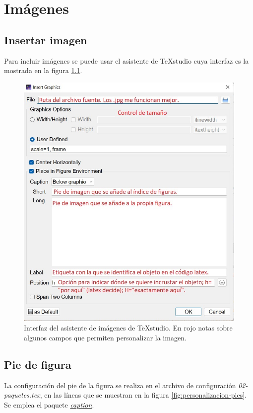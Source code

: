 \chapter{Imágenes}
%
\section{Insertar imagen}
Para incluir imágenes se puede usar el asistente de TeXstudio cuya interfaz es la mostrada en la figura \ref{fig:auxiliar-imagenes}.

\begin{figure}[h]
	\centering
	\includegraphics[scale=.65, frame]{cuerpo/cap-objetos/imagenes/auxiliar-imagenes}
	\caption[Interfaz del asistente de imágenes de TeXstudio.]{Interfaz del asistente de imágenes de TeXstudio. En rojo notas sobre algunos campos que permiten personalizar la imagen.}
	\label{fig:auxiliar-imagenes}
\end{figure}
%
\section{Pie de figura}
La configuración del pie de la figura se realiza en el archivo de configuración \textit{02-paquetes.tex}, en las líneas que se muestran en la figura \ref{fig:personalizacion-pies}. Se emplea el paquete \href{https://www.ctan.org/pkg/caption}{\textit{caption}}.

